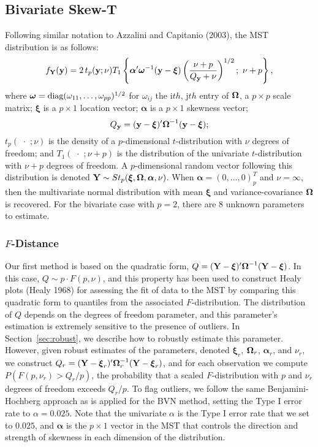 \documentclass[12pt]{article}
\def\balpha{{\boldsymbol \alpha}}
\def\bY{{\bf Y}}
\def\by{{\bf y}}
\def\balpha{{\boldsymbol \alpha}}
\def\bxi{{\boldsymbol \xi}}
\def\y{\mathbf{y}}
\def\bY{{\bf Y}}
\def\by{{\bf y}}
\def\bomega{{\ensuremath\boldsymbol{\omega}}}
\def\bOmega{{\ensuremath\boldsymbol{\Omega}}}
\def\bomega{{\ensuremath\boldsymbol{\omega}}}
\def\bOmega{{\ensuremath\boldsymbol{\Omega}}}
\begin{document}
\begin{doublespacing}
\subsection{Bivariate Skew-T}\label{subsec:bst}

Following similar notation to Azzalini and Capitanio (2003), the MST distribution is as follows:
$$f_\bY(\y) = 2\,t_p(\y; \nu) T_1 \left\{\balpha'\bomega^{-1}(\y-\bxi)\left(\frac{\nu + p}{Q_{\by}+\nu} \right)^{1/2} ;\,\,\nu+p\right\},$$
where $\bomega =\mbox{diag}(\omega_{11}, \ldots, \omega_{pp})^{1/2}$ for $\omega_{ij}$ the i$th$, j$th$ entry of $\bOmega$, a $p\times p$ scale matrix; $\bxi$ is  a $p\times 1$ location vector; $\balpha$ is a $p\times 1$ skewness vector; 
$$Q_{\by} = (\by-\bxi)'\bOmega^{-1}(\by-\bxi);$$
$t_p(\,\,\cdot\,\,;\nu)$ is the density of a $p$-dimensional $t$-distribution with $\nu$ degrees of freedom; and   $T_1(\,\,\cdot\,\,;\nu+p)$ is the distribution of the univariate $t$-distribution with $\nu+p$ degrees of freedom.  A $p$-dimensional random vector following this distribution is denoted $\bY \sim St_p(\bxi, \bOmega,\balpha, \nu)$.   When $\balpha = (0, \ldots, 0)_p^T$ and $\nu=\infty$, then the multivariate normal distribution with mean $\bxi$ and variance-covariance $\bOmega$ is recovered.  For the bivariate case with $p=2$,  there are 8 unknown parameters to estimate.

\subsubsection{$F$-Distance}

Our first method is based on the  quadratic form, $Q=(\bY-\bxi)'\bOmega^{-1}(\bY-\bxi)$.  In this case, $Q\sim p\cdot F(p,\nu)$, and this property has been used to construct Healy plots (Healy 1968) for assessing the fit of data to the MST by comparing this quadratic form to quantiles from the associated $F$-distribution.  The distribution of $Q$ depends on the degrees of freedom  parameter, and this parameter's estimation is extremely sensitive to the presence of outliers.  In  Section~\ref{sec:robust}, we describe how to robustly estimate this parameter.  However, given robust estimates of the parameters, denoted $\bxi_r$, $\bOmega_r$, $\balpha_r$, and $\nu_r$, we construct $Q_r = (\bY-\bxi_r)'\bOmega_r^{-1}(\bY-\bxi_r)$,  and for each observation we compute $P(F(p,\nu_r) > Q_r/p)$, the probability that a scaled $F$-distribution with $p$ and $\nu_r$ degrees of freedom exceeds $Q_r/p$. To flag outliers, we  follow the same Benjamini-Hochberg approach as is applied for the BVN method, setting the Type I error rate to $\alpha=0.025$. Note that the univariate $\alpha$ is the Type I error rate that we set to $0.025$, and $\balpha$ is the $p\times 1$ vector in the MST that controls the direction and strength of skewness in each dimension of the distribution.  


\end{doublespacing}
\end{document}
